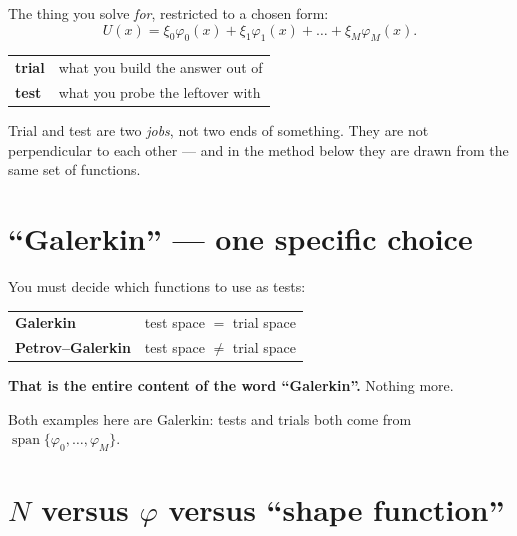 \documentclass[11pt]{article}
\begin{document}
The thing you solve \emph{for}, restricted to a chosen form:
\[
  U(x)=\xi_0\varphi_0(x)+\xi_1\varphi_1(x)+\dots+\xi_M\varphi_M(x).
\]

\begin{center}\small
\begin{tabular}{@{}ll@{}}
\toprule
\textbf{trial} & what you build the answer out of\\
\textbf{test}  & what you probe the leftover with\\
\bottomrule
\end{tabular}
\end{center}

\begin{pitfall}
Trial and test are two \emph{jobs}, not two ends of something. They are not
perpendicular to each other --- and in the method below they are drawn from the
same set of functions.
\end{pitfall}

\section{``Galerkin'' --- one specific choice}

You must decide which functions to use as tests:

\begin{center}\small
\renewcommand{\arraystretch}{1.25}
\begin{tabular}{@{}ll@{}}
\toprule
\textbf{Galerkin}        & test space $=$ trial space \\
\textbf{Petrov--Galerkin}& test space $\neq$ trial space \\
\bottomrule
\end{tabular}
\end{center}

\begin{pts}
\item \textbf{That is the entire content of the word ``Galerkin''.} Nothing more.
\item Both examples here are Galerkin: tests and trials both come from
      $\operatorname{span}\{\varphi_0,\dots,\varphi_M\}$.
\end{pts}

\section{$N$ versus $\varphi$ versus ``shape function''}
\end{document}
